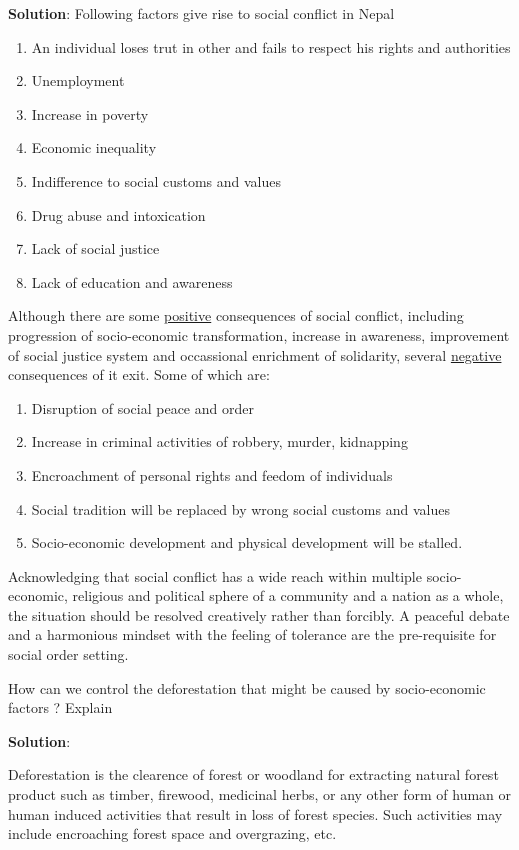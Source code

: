 \documentclass[
  openany]{book}
\newcommand{\question}{\item}
\newenvironment{solution}{ {\bfseries Solution}:}{}
\begin{document}
\begin{questions}
\begin{solution}
Following factors give rise to social conflict in Nepal

\begin{enumerate}
\item An individual loses trut in other and fails to respect his rights and authorities
\item Unemployment
\item Increase in poverty
\item Economic inequality
\item Indifference to social customs and values
\item Drug abuse and intoxication
\item Lack of social justice
\item Lack of education and awareness
\end{enumerate}

Although there are some \underline{positive} consequences of social conflict, including progression of socio-economic transformation, increase in awareness, improvement of social justice system and occassional enrichment of solidarity, several \underline{negative} consequences of it exit. Some of which are:

\begin{enumerate}
\item Disruption of social peace and order
\item Increase in criminal activities of robbery, murder, kidnapping
\item Encroachment of personal rights and feedom of individuals
\item Social tradition will be replaced by wrong social customs and values
\item Socio-economic development and physical development will be stalled.
\end{enumerate}

Acknowledging that social conflict has a wide reach within multiple socio-economic, religious and political sphere of a community and a nation as a whole, the situation should be resolved creatively rather than forcibly. A peaceful debate and a harmonious mindset with the feeling of tolerance are the pre-requisite for social order setting.
\end{solution}

\question How can we control the deforestation that might be caused by socio-economic factors ? Explain

\begin{solution}

Deforestation is the clearence of forest or woodland for extracting natural forest product such as timber, firewood, medicinal herbs, or any other form of human or human induced activities that result in loss of forest species. Such activities may include encroaching forest space and overgrazing, etc.


\end{solution}
\end{questions}
\end{document}
